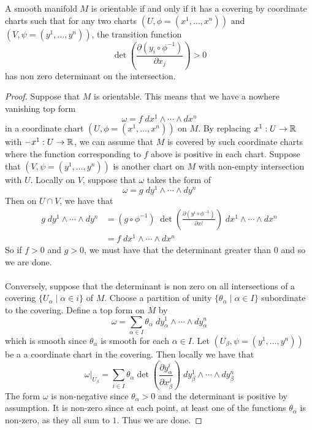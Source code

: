 \documentclass[a4paper]{article}
\begin{document}
\begin{prp}{}{} A smooth manifold $M$ is orientable if and only if it has a covering by coordinate charts such that for any two charts $(U,\phi=(x^1,\dots,x^n))$ and $(V,\psi=(y^1,\dots,y^n))$, the transition function $$\det\left(\frac{\partial(y_i\circ\phi^{-1})}{\partial x_j}\right)>0$$ has non zero determinant on the intersection. \tcbline
\begin{proof}
Suppose that $M$ is orientable. This means that we have a nowhere vanishing top form $$\omega=f\;dx^1\wedge\cdots\wedge dx^n$$ in a coordinate chart $(U,\phi=(x^1,\dots,x^n))$ on $M$. By replacing $x^1:U\to\mathbb{R}$ with $-x^1:U\to\mathbb{R}$, we can assume that $M$ is covered by such coordinate charts where the function corresponding to $f$ above is positive in each chart. Suppose that $(V,\psi=(y^1,\dots,y^n))$ is another chart on $M$ with non-empty intersection with $U$. Locally on $V$, suppose that $\omega$ takes the form of $$\omega=g\;dy^1\wedge\cdots\wedge dy^n$$ Then on $U\cap V$, we have that 
\begin{align*}
g\;dy^1\wedge\cdots\wedge dy^n&=(g\circ\phi^{-1})\;\det\left(\frac{\partial (y^i\circ\phi^{-1})}{\partial x^j}\right)\;dx^1\wedge\cdots\wedge dx^n\\
&=f\;dx^1\wedge\cdots\wedge dx^n
\end{align*}
So if $f>0$ and $g>0$, we must have that the determinant greater than $0$ and so we are done. \\~\\

Conversely, suppose that the determinant is non zero on all intersections of a covering $\{U_\alpha\;|\;\alpha\in i\}$ of $M$. Choose a partition of unity $\{\theta_\alpha\;|\;\alpha\in I\}$ subordinate to the covering. Define a top form on $M$ by $$\omega=\sum_{\alpha\in I}\theta_\alpha\;dy_\alpha^1\wedge\cdots\wedge dy_\alpha^n$$ which is smooth since $\theta_\alpha$ is smooth for each $\alpha\in I$. Let $(U_\beta,\psi=(y^1,\dots,y^n))$ be a a coordinate chart in the covering. Then locally we have that $$\omega|_{U_\beta}=\sum_{i\in I}\theta_\alpha\det\left(\frac{\partial y_\alpha^i}{\partial x_\beta^j}\right)\;dy_\beta^1\wedge\cdots\wedge dy_\beta^n$$ The form $\omega$ is non-negative since $\theta_\alpha>0$ and the determinant is positive by assumption. It is non-zero since at each point, at least one of the functions $\theta_\alpha$ is non-zero, as they all sum to $1$. Thus we are done. 
\end{proof}
\end{prp}
\end{document}
